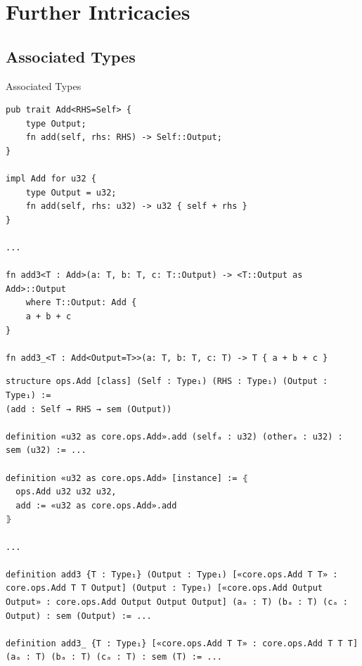\documentclass{beamer}
\begin{document}
\section{Further Intricacies}
\subsection{Associated Types}
\begin{frame}[fragile]{Associated Types}
  \begin{verbatim}
pub trait Add<RHS=Self> {
    type Output;
    fn add(self, rhs: RHS) -> Self::Output;
}

impl Add for u32 {
    type Output = u32;
    fn add(self, rhs: u32) -> u32 { self + rhs }
}

...

fn add3<T : Add>(a: T, b: T, c: T::Output) -> <T::Output as Add>::Output
    where T::Output: Add {
    a + b + c
}

fn add3_<T : Add<Output=T>>(a: T, b: T, c: T) -> T { a + b + c }
  \end{verbatim}
  \pause
  \begin{verbatim}
structure ops.Add [class] (Self : Type₁) (RHS : Type₁) (Output : Type₁) :=
(add : Self → RHS → sem (Output))

definition «u32 as core.ops.Add».add (selfₐ : u32) (otherₐ : u32) : sem (u32) := ...

definition «u32 as core.ops.Add» [instance] := ⦃
  ops.Add u32 u32 u32,
  add := «u32 as core.ops.Add».add
⦄

...

definition add3 {T : Type₁} (Output : Type₁) [«core.ops.Add T T» : core.ops.Add T T Output] (Output : Type₁) [«core.ops.Add Output Output» : core.ops.Add Output Output Output] (aₐ : T) (bₐ : T) (cₐ : Output) : sem (Output) := ...

definition add3_ {T : Type₁} [«core.ops.Add T T» : core.ops.Add T T T] (aₐ : T) (bₐ : T) (cₐ : T) : sem (T) := ...
  \end{verbatim}
\end{frame}
\end{document}
